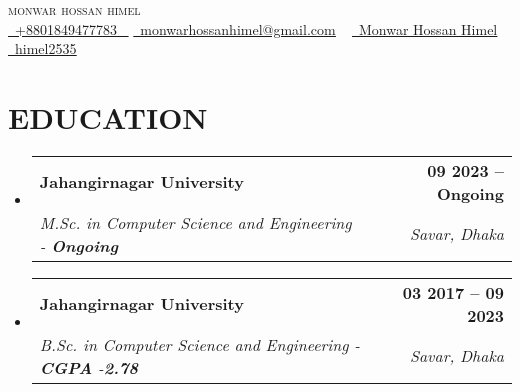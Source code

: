 \documentclass[letterpaper,11pt]{article}
\makeatletter
\newcommand{\resumeSubheading}[4]{
  \vspace{-2pt}\item
    \begin{tabular*}{1.0\textwidth}[t]{l@{\extracolsep{\fill}}r}
      \textbf{\large#1} & \textbf{\small #2} \\
      \textit{\large#3} & \textit{\small #4} \\
     
    \end{tabular*}\vspace{-7pt}
}
\newcommand{\resumeSubHeadingListStart}{\begin{itemize}[leftmargin=0.0in, label={}]}
\newcommand{\resumeSubHeadingListEnd}{\end{itemize}}
\makeatother
\begin{document}




\begin{center}
 {\Huge \scshape monwar hossan himel} \\ \vspace{5pt}
    \small \href{tel:+8801849477783}{ \raisebox{-0.1\height}\faPhone\ \underline{+8801849477783} ~} \href{mailto:monwarhossanhimel@gmail.com}{\raisebox{-0.2\height}\faEnvelope\  \underline{monwarhossanhimel@gmail.com}} ~
    \href{https://www.linkedin.com/in/monwar-hossan-himel-17089924a/}{\raisebox{-0.2\height}\faLinkedinSquare\ \underline{Monwar Hossan Himel}}  ~
    \href{https://github.com/himel2535}{\raisebox{-0.2\height}\faGithub\ \underline{himel2535}} ~
    \vspace{-3pt}
\end{center}



\vspace{-5pt}%
\section{EDUCATION}
\vspace{5pt}  \resumeSubHeadingListStart
    \resumeSubheading
      {Jahangirnagar University}{09 2023 -- Ongoing}
      {M.Sc. in Computer Science and Engineering - \textbf{}\textbf{Ongoing}}{Savar, Dhaka}
  \resumeSubHeadingListEnd
 
  \resumeSubHeadingListStart
    \resumeSubheading
      {Jahangirnagar University}{03 2017 -- 09 2023}
      {B.Sc. in Computer Science and Engineering - \textbf{CGPA} -\textbf{2.78}}{Savar, Dhaka}
  \resumeSubHeadingListEnd
  


\vspace{-5pt}
\end{document}
